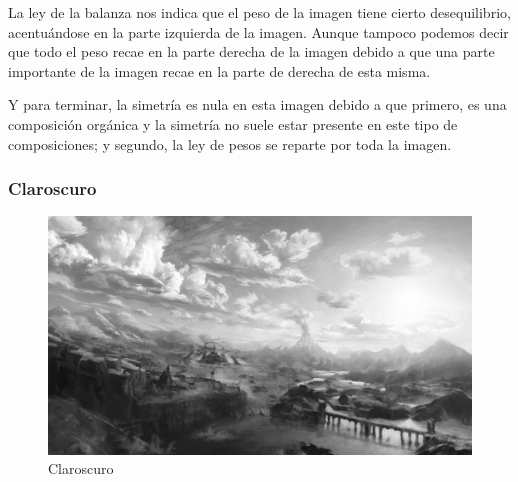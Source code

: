 \documentclass[12pt]{article}
\begin{document}
          La ley de la balanza nos indica que el peso de la imagen tiene cierto desequilibrio, acentuándose en la parte izquierda de la imagen.
          Aunque tampoco podemos decir que todo el peso recae en la parte derecha de la imagen debido a que una parte importante de la imagen recae en la parte de derecha de esta misma. 

          Y para terminar, la simetría es nula en esta imagen debido a que primero, es una composición orgánica y la simetría no suele estar presente en este tipo de composiciones; y segundo, la ley de pesos se reparte por toda la imagen. 
          \newpage
        \subsubsection{Claroscuro}
          \begin{figure}[H]
            \centering
            \includegraphics[scale = 0.2]{Jesus/Seccion2/Clarocuro.jpg}
            \caption{Claroscuro}
          \end{figure}
\end{document}
